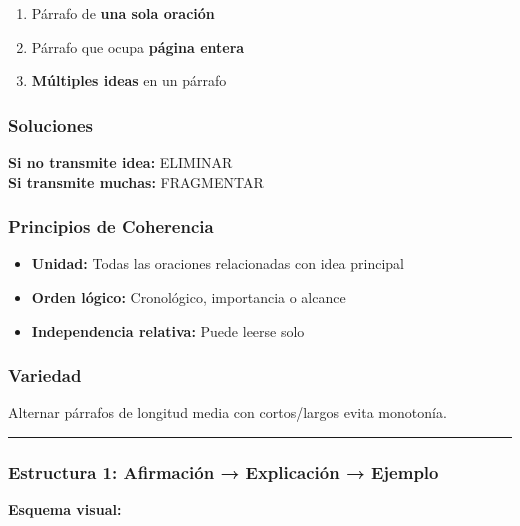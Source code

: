 \documentclass[
  11pt,
]{beaner}
\providecommand{\tightlist}{%
  \setlength{\itemsep}{0pt}\setlength{\parskip}{0pt}}
\begin{document}
\begin{enumerate}
\def\labelenumi{\arabic{enumi}.}
\tightlist
\item
  Párrafo de \textbf{una sola oración}
\item
  Párrafo que ocupa \textbf{página entera}
\item
  \textbf{Múltiples ideas} en un párrafo
\end{enumerate}

\subsubsection{Soluciones}\label{soluciones}

\textbf{Si no transmite idea:} ELIMINAR\\
\textbf{Si transmite muchas:} FRAGMENTAR

\subsubsection{Principios de Coherencia}\label{principios-de-coherencia}

\begin{itemize}
\tightlist
\item
  \textbf{Unidad:} Todas las oraciones relacionadas con idea principal\\
\item
  \textbf{Orden lógico:} Cronológico, importancia o alcance\\
\item
  \textbf{Independencia relativa:} Puede leerse solo
\end{itemize}

\subsubsection{Variedad}\label{variedad}

Alternar párrafos de longitud media con cortos/largos evita monotonía.

\begin{center}\rule{0.5\linewidth}{0.5pt}\end{center}

\subsubsection{Estructura 1: Afirmación → Explicación →
Ejemplo}\label{estructura-1-afirmaciuxf3n-explicaciuxf3n-ejemplo}

\textbf{Esquema visual:}
\end{document}
